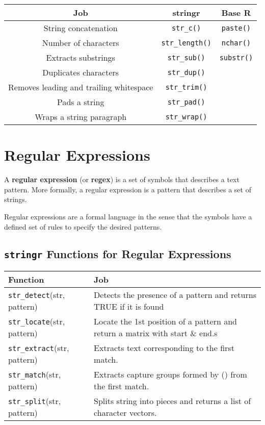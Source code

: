\documentclass[
]{book}
\begin{document}
\begin{longtable}[]{@{}ccc@{}}
\toprule
Job & stringr & Base R \\
\midrule
\endhead
String concatenation & \texttt{str\_c()} & \texttt{paste()} \\
Number of characters & \texttt{str\_length()} & \texttt{nchar()} \\
Extracts substrings & \texttt{str\_sub()} & \texttt{substr()} \\
Duplicates characters & \texttt{str\_dup()} & \\
Removes leading and trailing whitespace & \texttt{str\_trim()} & \\
Pads a string & \texttt{str\_pad()} & \\
Wraps a string paragraph & \texttt{str\_wrap()} & \\
\bottomrule
\end{longtable}

\hypertarget{regular-expressions}{%
\section{Regular Expressions}\label{regular-expressions}}

A \textbf{regular expression} (or \textbf{regex}) is a set of symbols that describes a text pattern. More formally, a regular expression is a pattern that describes a set of strings.

Regular expressions are a formal language in the sense that the symbols have a defined set of rules to specify the desired patterns.

\hypertarget{stringr-functions-for-regular-expressions}{%
\subsection{\texorpdfstring{\texttt{stringr} Functions for Regular Expressions}{stringr Functions for Regular Expressions}}\label{stringr-functions-for-regular-expressions}}

\begin{longtable}[]{@{}
  >{\centering\arraybackslash}p{}
  >{\centering\arraybackslash}p{}@{}}
\toprule
Function & Job \\
\midrule
\endhead
\texttt{str\_detect}(str, pattern) & Detects the presence of a pattern and returns TRUE if it is found \\
\texttt{str\_locate}(str, pattern) & Locate the 1st position of a pattern and return a matrix with start \& end.s \\
\texttt{str\_extract}(str, pattern) & Extracts text corresponding to the first match. \\
\texttt{str\_match}(str, pattern) & Extracts capture groups formed by () from the first match. \\
\texttt{str\_split}(str, pattern) & Splits string into pieces and returns a list of character vectors. \\
\bottomrule
\end{longtable}
\end{document}

